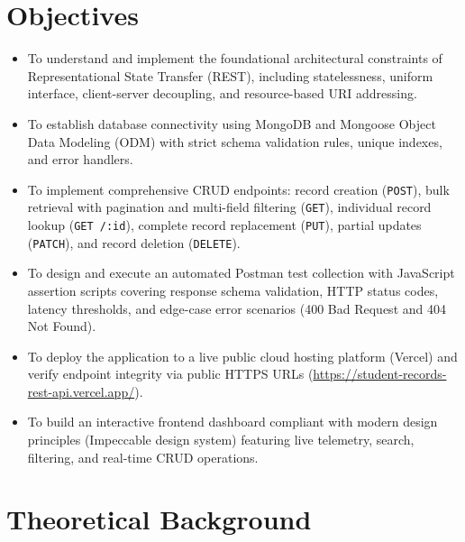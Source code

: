 \documentclass[11pt,a4paper]{article}
\begin{document}
\section{Objectives}
\begin{itemize}
    \item To understand and implement the foundational architectural constraints of Representational State Transfer (REST), including statelessness, uniform interface, client-server decoupling, and resource-based URI addressing.
    \item To establish database connectivity using MongoDB and Mongoose Object Data Modeling (ODM) with strict schema validation rules, unique indexes, and error handlers.
    \item To implement comprehensive CRUD endpoints: record creation (\texttt{POST}), bulk retrieval with pagination and multi-field filtering (\texttt{GET}), individual record lookup (\texttt{GET /:id}), complete record replacement (\texttt{PUT}), partial updates (\texttt{PATCH}), and record deletion (\texttt{DELETE}).
    \item To design and execute an automated Postman test collection with JavaScript assertion scripts covering response schema validation, HTTP status codes, latency thresholds, and edge-case error scenarios (400 Bad Request and 404 Not Found).
    \item To deploy the application to a live public cloud hosting platform (Vercel) and verify endpoint integrity via public HTTPS URLs (\url{https://student-records-rest-api.vercel.app/}).
    \item To build an interactive frontend dashboard compliant with modern design principles (Impeccable design system) featuring live telemetry, search, filtering, and real-time CRUD operations.
\end{itemize}

\newpage
\section{Theoretical Background}
\end{document}
